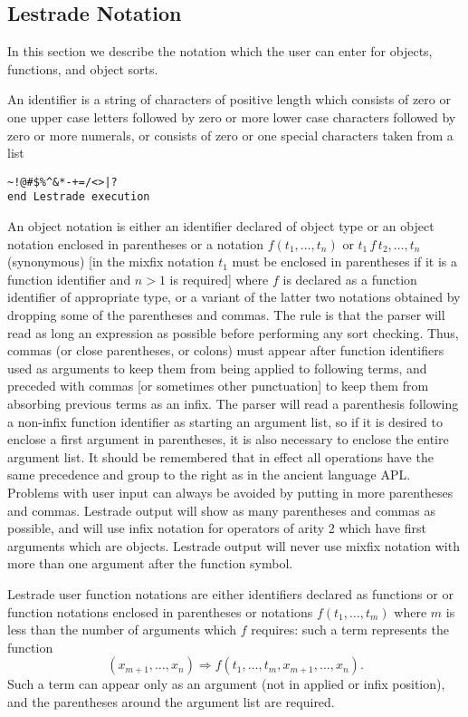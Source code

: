 \documentclass[12pt]{article}
\begin{document}
\subsection{Lestrade Notation}

In this section we describe the notation which the user can enter for objects, functions, and object sorts.

An identifier is a string of characters of positive length which consists of zero or one upper case letters followed by zero or more lower case characters followed by zero or more numerals, or consists of zero or one special characters taken from a list      \begin{verbatim}
~!@#$%^&*-+=/<>|?
end Lestrade execution
\end{verbatim}

An object notation is either an identifier declared of object type or an object notation enclosed in parentheses or a notation $f(t_1,\ldots,t_n)$  or $t_1\, f \,t_2,\ldots,t_n$ (synonymous) [in the mixfix notation  $t_1$ must be enclosed in parentheses if it is a function identifier and $n>1$ is required]  where
$f$ is declared as a function identifier of appropriate type, or a variant of the latter two notations obtained by dropping some of the parentheses and commas.  The rule is that the parser will read as long an expression as possible before performing any sort checking.  Thus, commas (or close parentheses, or colons) must appear after function
identifiers used as arguments to keep them from being applied to following terms, and preceded with commas [or sometimes other punctuation]  to keep them from absorbing previous terms as an infix.  The parser will read a parenthesis following a non-infix function identifier as starting an argument list, so if it is desired to enclose a first argument in parentheses, it is also necessary to enclose the entire argument list.  It should be remembered that in effect all operations have the same precedence and group to the right as in the ancient language APL.  Problems with user input can always be avoided by putting in more parentheses and commas.  Lestrade output will show as many parentheses and commas as possible, and will use infix notation for operators of arity 2 which have first arguments which are objects.  Lestrade output will never use mixfix notation with more than one argument after the function symbol.

Lestrade user function notations are either identifiers declared as functions or or function notations enclosed in parentheses or notations $f(t_1,\ldots,t_m)$ where $m$ is less than the number of arguments which $f$ requires:  such a term represents the function $$(x_{m+1},\ldots,x_n) \Rightarrow f(t_1,\ldots,t_m,x_{m+1},\ldots,x_n).$$  Such a term can appear only as an argument (not in applied or infix position), and the parentheses around the argument list are required.
\end{document}
